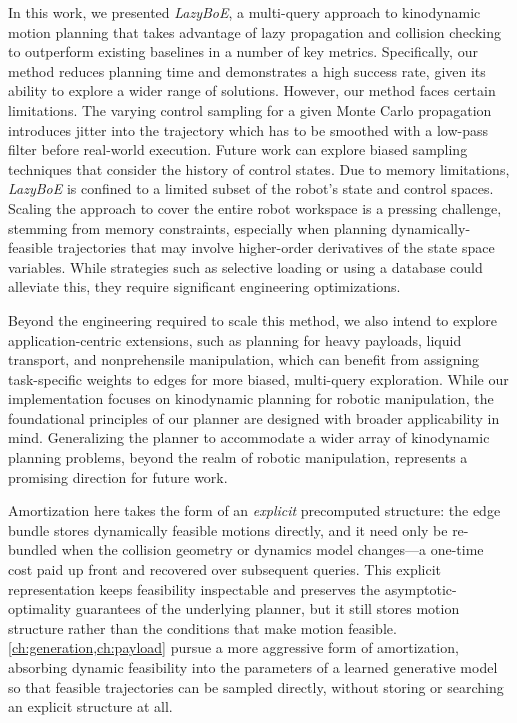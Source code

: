 In this work, we presented \textsl{LazyBoE}, a multi-query approach to kinodynamic motion planning that takes advantage of lazy propagation and collision checking to outperform existing baselines in a number of key metrics. Specifically, our method reduces planning time and demonstrates a high success rate, given its ability to explore a wider range of solutions.
However, our method faces certain limitations. The varying control sampling for a given Monte Carlo propagation introduces jitter into the trajectory which has to be smoothed with a low-pass filter before real-world execution. Future work can explore biased sampling techniques that consider the history of control states.
Due to memory limitations, \textsl{LazyBoE} is confined to a limited subset of the robot's state and control spaces.
Scaling the approach to cover the entire robot workspace is a pressing challenge, stemming from memory constraints, especially when planning dynamically-feasible trajectories that may involve higher-order derivatives of the state space variables. While strategies such as selective loading or using a database could alleviate this, they require significant engineering optimizations.

Beyond the engineering required to scale this method, we also intend to explore
application-centric extensions, such as planning for heavy payloads, liquid transport, and nonprehensile manipulation,
which can benefit from assigning task-specific weights to edges for more biased, multi-query exploration.
While our implementation focuses on kinodynamic planning for robotic manipulation, the foundational principles of our planner are designed with broader applicability in mind. Generalizing the planner to accommodate a wider array of kinodynamic planning problems, beyond the realm of robotic manipulation, represents a promising direction for future work.

Amortization here takes the form of an \emph{explicit} precomputed structure: the edge bundle stores dynamically feasible motions directly, and it need only be re-bundled when the collision geometry or dynamics model changes---a one-time cost paid up front and recovered over subsequent queries.
This explicit representation keeps feasibility inspectable and preserves the asymptotic-optimality guarantees of the underlying planner, but it still stores motion structure rather than the conditions that make motion feasible.
\cref{ch:generation,ch:payload} pursue a more aggressive form of amortization, absorbing dynamic feasibility into the parameters of a learned generative model so that feasible trajectories can be sampled directly, without storing or searching an explicit structure at all.
